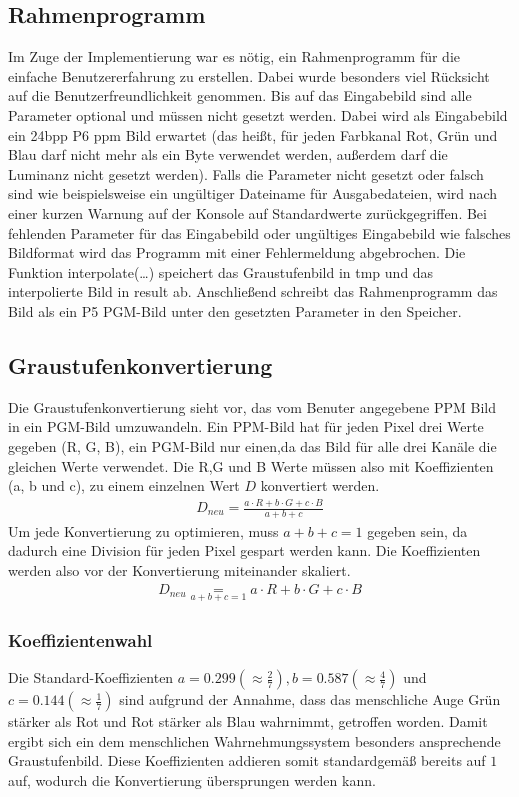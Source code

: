 \documentclass[course=erap]{aspdoc}
\begin{document}
\subsection{Rahmenprogramm}
Im Zuge der Implementierung war es nötig, ein Rahmenprogramm für die einfache Benutzererfahrung zu erstellen. Dabei wurde besonders viel Rücksicht auf die Benutzerfreundlichkeit genommen. Bis auf das Eingabebild sind alle Parameter optional und müssen nicht gesetzt werden. Dabei wird als Eingabebild ein 24bpp P6 ppm Bild erwartet (das heißt, für jeden Farbkanal Rot, Grün und Blau darf nicht mehr als ein Byte verwendet werden, außerdem darf die Luminanz nicht gesetzt werden). Falls die Parameter nicht gesetzt oder falsch sind wie beispielsweise ein ungültiger Dateiname für Ausgabedateien, wird nach einer kurzen Warnung auf der Konsole auf Standardwerte zurückgegriffen. Bei fehlenden Parameter für das Eingabebild oder ungültiges Eingabebild wie falsches Bildformat wird das Programm mit einer Fehlermeldung abgebrochen. Die Funktion interpolate(…) speichert das Graustufenbild in tmp und das interpolierte Bild in result ab. Anschließend schreibt das Rahmenprogramm das Bild als ein P5 PGM-Bild unter den gesetzten Parameter in den Speicher.

\subsection{Graustufenkonvertierung}
Die Graustufenkonvertierung sieht vor, das vom Benuter angegebene PPM Bild in ein PGM-Bild umzuwandeln. Ein PPM-Bild hat für jeden Pixel drei Werte gegeben (R, G, B), ein PGM-Bild nur einen,da das Bild für alle drei Kanäle die gleichen Werte verwendet. Die R,G und B Werte müssen also mit Koeffizienten (a, b und c), zu einem einzelnen Wert $D$ konvertiert werden.
 \begin{align}
    D_{neu} {=} \frac{a \cdot R + b \cdot G + c \cdot B}{a + b + c}
\end{align}
Um jede Konvertierung zu optimieren, muss $a + b + c = 1$ gegeben sein, da dadurch eine Division für jeden Pixel gespart werden kann. Die Koeffizienten werden also vor der Konvertierung miteinander skaliert.
 \begin{align}
    D_{neu} \underset{a + b + c = 1}{=} a \cdot R + b \cdot G + c \cdot B
\end{align}

\subsubsection{Koeffizientenwahl}
Die Standard-Koeffizienten $a = 0.299 (\approx \frac{2}{7}), b = 0.587 (\approx \frac{4}{7})$ und $c = 0.144 ( \approx \frac{1}{7})$ sind aufgrund der Annahme, dass das menschliche Auge Grün stärker als Rot und Rot stärker als Blau wahrnimmt, getroffen worden. Damit ergibt sich ein dem menschlichen Wahrnehmungssystem besonders ansprechende Graustufenbild. Diese Koeffizienten addieren somit standardgemäß bereits auf $1$ auf, wodurch die Konvertierung übersprungen werden kann. 
\end{document}

